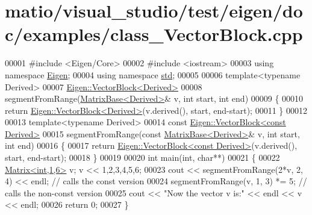 \hypertarget{matio_2visual__studio_2test_2eigen_2doc_2examples_2class___vector_block_8cpp_source}{}\section{matio/visual\+\_\+studio/test/eigen/doc/examples/class\+\_\+\+Vector\+Block.cpp}
\label{matio_2visual__studio_2test_2eigen_2doc_2examples_2class___vector_block_8cpp_source}

\begin{DoxyCode}
00001 \textcolor{preprocessor}{#include <Eigen/Core>}
00002 \textcolor{preprocessor}{#include <iostream>}
00003 \textcolor{keyword}{using namespace }\hyperlink{namespace_eigen}{Eigen};
00004 \textcolor{keyword}{using namespace }\hyperlink{namespacestd}{std};
00005 
00006 \textcolor{keyword}{template}<\textcolor{keyword}{typename} Derived>
00007 \hyperlink{group___core___module_class_eigen_1_1_vector_block}{Eigen::VectorBlock<Derived>}
00008 segmentFromRange(\hyperlink{group___core___module_class_eigen_1_1_matrix_base}{MatrixBase<Derived>}& v, \textcolor{keywordtype}{int} start, \textcolor{keywordtype}{int} end)
00009 \{
00010   \textcolor{keywordflow}{return} \hyperlink{group___core___module_class_eigen_1_1_vector_block}{Eigen::VectorBlock<Derived>}(v.derived(), start, end-start);
00011 \}
00012 
00013 \textcolor{keyword}{template}<\textcolor{keyword}{typename} Derived>
00014 \textcolor{keyword}{const} \hyperlink{group___core___module_class_eigen_1_1_vector_block}{Eigen::VectorBlock<const Derived>}
00015 segmentFromRange(\textcolor{keyword}{const} \hyperlink{group___core___module_class_eigen_1_1_matrix_base}{MatrixBase<Derived>}& v, \textcolor{keywordtype}{int} start, \textcolor{keywordtype}{int} end)
00016 \{
00017   \textcolor{keywordflow}{return} \hyperlink{group___core___module_class_eigen_1_1_vector_block}{Eigen::VectorBlock<const Derived>}(v.derived(), start, end-start);
00018 \}
00019 
00020 \textcolor{keywordtype}{int} main(\textcolor{keywordtype}{int}, \textcolor{keywordtype}{char}**)
00021 \{
00022   \hyperlink{group___core___module_class_eigen_1_1_matrix}{Matrix<int,1,6>} v; v << 1,2,3,4,5,6;
00023   cout << segmentFromRange(2*v, 2, 4) << endl; \textcolor{comment}{// calls the const version}
00024   segmentFromRange(v, 1, 3) *= 5;              \textcolor{comment}{// calls the non-const version}
00025   cout << \textcolor{stringliteral}{"Now the vector v is:"} << endl << v << endl;
00026   \textcolor{keywordflow}{return} 0;
00027 \}
\end{DoxyCode}

